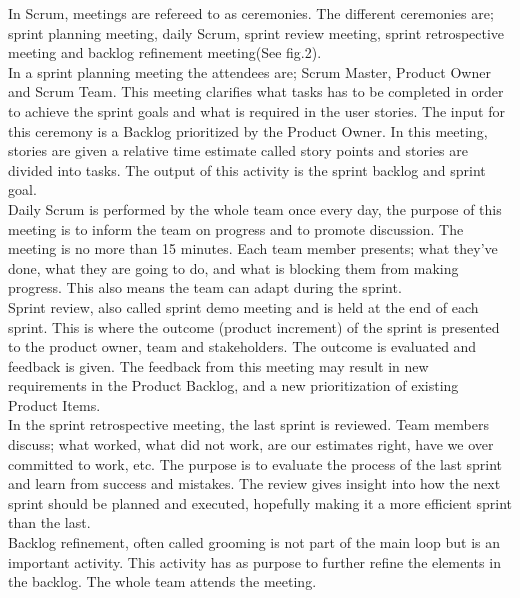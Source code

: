 In Scrum, meetings are refereed to as ceremonies. The different ceremonies are; sprint planning meeting, daily Scrum, sprint review meeting, sprint retrospective meeting and backlog refinement meeting(See fig.2). 
\\
\newline
In a sprint planning meeting the attendees are; Scrum Master, Product Owner and Scrum Team. This meeting clarifies what tasks has to be completed in order to achieve the sprint goals and what is required in 
the user stories. The input for this ceremony is a Backlog prioritized by the Product Owner. In this meeting, stories are given a relative time estimate called story points and stories are divided into tasks. The output of this activity is the sprint backlog and sprint goal.
\\
\newline
Daily Scrum is performed by the whole team once every day, the purpose of this meeting is to inform the team on progress and to promote discussion. The meeting is no more than 15 minutes. Each team member presents; what they've done, what they are going to do, and what is blocking them from making progress. This also means the team can adapt during the sprint.
\\
\newline
Sprint review, also called sprint demo meeting and is held at the end of each sprint. This is where the outcome (product increment) of the sprint is presented to the product owner, team and stakeholders. The outcome is evaluated and feedback is given. The feedback from this meeting may result in new requirements in the Product Backlog, and a new prioritization of existing Product Items.
\\
\newline
In the sprint retrospective meeting, the last sprint is reviewed. Team members discuss; what worked, what did not work, are our estimates right, have we over committed to work, etc. The purpose is to evaluate the process of the last sprint and learn from success and mistakes. The review gives insight into how the next sprint should be planned and executed, hopefully making it a more efficient sprint than the last.
\\
\newline
Backlog refinement, often called grooming is not part of the main loop but is an important activity. This activity has as purpose to further refine the elements in the backlog. The whole team attends the meeting.



